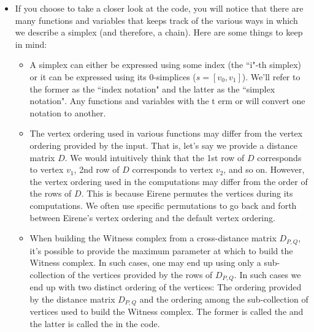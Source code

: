 \documentclass{article}
\begin{document}
\begin{itemize}
\item If you choose to take a closer look at the code, you will notice that there are many functions and variables that keeps track of the various ways in which we describe a simplex (and therefore, a chain). Here are some things to keep in mind:
\begin{itemize}
\item A simplex can either be expressed using some index (the ``i"-th simplex) or it can be expressed using its 0-simplices ($ s = [v_0, v_1]$). We'll refer to the former as the ``index notation" and the latter as the ``simplex notation". Any functions and variables with the t erm  or  will convert one notation to another.
\item The vertex ordering used in various functions may differ from the vertex ordering provided by the input. That is, let's say we provide a distance matrix $D$. We would intuitively think that the 1st row of $D$ corresponds to vertex $v_1$, 2nd row of $D$ corresponds to vertex $v_2$, and so on. However, the vertex ordering used in the computations may differ from the order of the rows of $D$. This is because Eirene permutes the vertices during its computations. We often use specific permutations to go back and forth between Eirene's vertex ordering and the default vertex ordering. 
\item When building the Witness complex from a cross-distance matrix $D_{P,Q}$, it's possible to provide the maximum parameter at which to build the Witness complex. In such cases, one may end up using only a sub-collection of the vertices provided by the rows of $D_{P,Q}$. In such cases we end up with two distinct ordering of the vertices: The ordering provided by the distance matrix $D_{P,Q}$ and the ordering among the sub-collection of vertices used to build the Witness complex. The former is called the  and the latter is called the  in the code.
\end{itemize}

\end{itemize}

\end{document}
